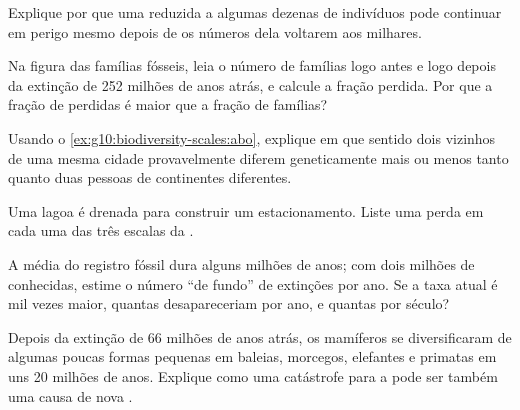 \begin{exercise}[$\star\star$]\label{exo:g10:biodiversity-scales:8}
Explique por que uma  reduzida a algumas dezenas de indivíduos
pode continuar em perigo mesmo depois de os números dela voltarem aos
milhares.
\end{exercise}

\begin{exercise}[$\star\star$]\label{exo:g10:biodiversity-scales:9}
Na figura das famílias fósseis, leia o número de famílias logo antes e
logo depois da extinção de 252 milhões de anos atrás, e calcule a
fração perdida. Por que a fração de \emph{} perdidas é maior
que a fração de famílias?
\end{exercise}

\begin{exercise}[$\star\star$]\label{exo:g10:biodiversity-scales:10}
Usando o \cref{ex:g10:biodiversity-scales:abo}, explique em que sentido
dois vizinhos de uma mesma cidade provavelmente diferem geneticamente
mais ou menos tanto quanto duas pessoas de continentes diferentes.
\end{exercise}

\begin{exercise}[$\star\star$]\label{exo:g10:biodiversity-scales:11}
Uma lagoa é drenada para construir um estacionamento. Liste uma perda
em cada uma das três escalas da .
\end{exercise}

\begin{exercise}[$\star\star\star$]\label{exo:g10:biodiversity-scales:12}
A  média do registro fóssil dura alguns milhões de anos; com
dois milhões de  conhecidas, estime o número ``de fundo'' de
extinções por ano. Se a taxa atual é mil vezes maior, quantas 
desapareceriam por ano, e quantas por século?
\end{exercise}

\begin{exercise}[$\star\star\star$]\label{exo:g10:biodiversity-scales:13}
Depois da extinção de 66 milhões de anos atrás, os mamíferos se
diversificaram de algumas poucas formas pequenas em baleias, morcegos,
elefantes e primatas em uns 20 milhões de anos. Explique como uma
catástrofe para a  pode ser também uma causa de nova
.
\end{exercise}

